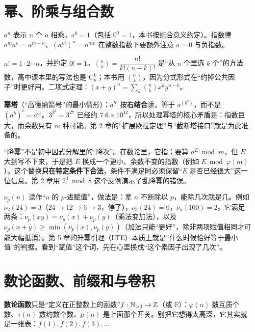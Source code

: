 \section{幂、阶乘与组合数}
$a^n$ 表示 $n$ 个 $a$ 相乘，$a^0=1$（包括 $0^0=1$，本书按组合意义约定）。指数律 $a^{m}a^{n}=a^{m+n}$、$(a^m)^n=a^{mn}$ 在整数指数下要额外注意 $a=0$ 与负指数。

$n!=1\cdot2\cdots n$，并约定 $0!=1$。$\binom{n}{k}=\dfrac{n!}{k!(n-k)!}$ 是“从 $n$ 个里选 $k$ 个”的方法数，高中课本里的写法也是 $\mathrm{C}_n^k$；本书用 $\binom{n}{k}$，因为分式形式在“约掉公共因子”时更好用。二项式定理：$(x+y)^n=\sum_{k}\binom{n}{k}x^{k}y^{n-k}$。

\textbf{幂塔}（“高德纳箭号”的最小情形）：$a^{b^{c}}$ 按\textbf{右结合}读，等于 $a^{(b^c)}$，而不是 $(a^b)^c=a^{bc}$。$3^{3^{3}}=3^{27}$ 已经约 $7.6\times10^{12}$，所以处理幂塔的核心矛盾是：指数巨大，而余数只有 $m$ 种可能。第 2 章的“扩展欧拉定理”与“截断塔接口”就是为此准备的。

\begin{tip}[“降幂”是什么意思]
“降幂”不是初中因式分解里的“降次”。在数论里，它指：要算 $a^E\bmod m$，但 $E$ 大到写不下来，于是把 $E$ 换成一个更小、余数不变的指数（例如 $E\bmod\varphi(m)$）。这个替换\textbf{只在特定条件下合法}，条件不满足时必须保留“$E$ 是否已经很大”这一位信息。第 2 章用 $2^4\bmod 8$ 这个反例演示了乱降幂的错误。
\end{tip}

\begin{tip}
$\nu_p(n)$ 读作“$n$ 的 $p$-进赋值”，做法是：拿 $n$ 不断除以 $p$，能除几次就是几。例如 $\nu_2(24)=3$（$24\to12\to6\to3$，停了），$\nu_3(24)=0$，$\nu_5(100)=2$。它满足两条：$\nu_p(xy)=\nu_p(x)+\nu_p(y)$（乘法变加法），以及 $\nu_p(x+y)\ge\min(\nu_p(x),\nu_p(y))$（加法只能“更好”，除非两项赋值相同才可能大幅抵消）。第 5 章的升幂引理（LTE）本质上就是“什么时候恰好等于最小值”的判据。看到“赋值”这个词，先在心里换成“这个素因子出现了几次”。
\end{tip}

\section{数论函数、前缀和与卷积}
\textbf{数论函数}只是“定义在正整数上的函数”$f:\mathbb N_{>0}\to\mathbb Z$（或 $\mathbb R$）：$\varphi(n)$ 数互质个数、$\tau(n)$ 数约数个数、$\mu(n)$ 是上面那个开关。别把它想得太高深，它其实就是一张表：$f(1),f(2),f(3),\ldots$

